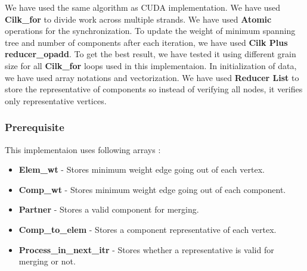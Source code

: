 \documentclass{article}
\begin{document}
We have used the same algorithm as CUDA implementation. We have used \textbf{Cilk\_for} to divide work across multiple strands. We have used \textbf{Atomic} operations for the synchronization. To update the weight of minimum spanning tree and number of components after each iteration, we have used \textbf{Cilk Plus reducer\_opadd}. To get the best result, we have tested it using different grain size for all \textbf{Cilk\_for} loops used in this implementaion. In initialization of data, we have used array notations and vectorization. We have used \textbf{Reducer List} to store the representative of components so instead of verifying all nodes, it verifies only representative vertices.     


\subsubsection{Prerequisite}
This implementaion uses following arrays :
\begin{itemize}
\item \textbf{Elem\_wt} - Stores minimum weight edge going out of each vertex.
\item \textbf{Comp\_wt} - Stores minimum weight edge going out of each component.
\item \textbf{Partner} - Stores a valid component for merging.
\item \textbf{Comp\_to\_elem} - Stores a component representative of each vertex.
\item \textbf{Process\_in\_next\_itr} - Stores whether a representative is valid for merging or not.     
\end{itemize}
\end{document}
